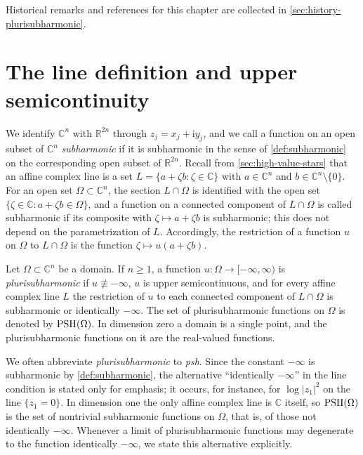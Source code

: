 Historical remarks and references for this chapter are collected in \cref{sec:history-plurisubharmonic}.

\section{The line definition and upper semicontinuity}
\label{sec:psh-definition}

We identify $\mathbb{C}^n$ with $\mathbb R^{2n}$ through $z_j=x_j+\mathrm{i}y_j$, and we call a function on an open subset of $\mathbb{C}^n$ \emph{subharmonic} if it is subharmonic in the sense of \cref{def:subharmonic} on the corresponding open subset of $\mathbb R^{2n}$. Recall from \cref{sec:high-value-stars} that an affine complex line is a set $L=\{a+\zeta b:\zeta\in\mathbb{C}\}$ with $a\in\mathbb{C}^n$ and $b\in\mathbb{C}^n\setminus\{0\}$. For an open set $\Omega\subset\mathbb{C}^n$, the section $L\cap\Omega$ is identified with the open set $\{\zeta\in\mathbb{C}:a+\zeta b\in\Omega\}$, and a function on a connected component of $L\cap\Omega$ is called subharmonic if its composite with $\zeta\mapsto a+\zeta b$ is subharmonic; this does not depend on the parametrization of $L$. Accordingly, the restriction of a function $u$ on $\Omega$ to $L\cap\Omega$ is the function $\zeta\mapsto u(a+\zeta b)$.

\begin{definition}\label{def:plurisubharmonic}
Let $\Omega\subset\mathbb{C}^n$ be a domain. If $n\ge1$, a function $u\colon\Omega\to[-\infty,\infty)$ is \emph{plurisubharmonic} if $u\not\equiv-\infty$, $u$ is upper semicontinuous, and for every affine complex line $L$ the restriction of $u$ to each connected component of $L\cap\Omega$ is subharmonic or identically $-\infty$. The set of plurisubharmonic functions on $\Omega$ is denoted by $\mathrm{PSH}(\Omega)$. In dimension zero a domain is a single point, and the plurisubharmonic functions on it are the real-valued functions.
\end{definition}
We often abbreviate \emph{plurisubharmonic} to \emph{psh}. Since the constant $-\infty$ is subharmonic by \cref{def:subharmonic}, the alternative ``identically $-\infty$'' in the line condition is stated only for emphasis; it occurs, for instance, for $\log|z_1|^2$ on the line $\{z_1=0\}$. In dimension one the only affine complex line is $\mathbb{C}$ itself, so $\mathrm{PSH}(\Omega)$ is the set of nontrivial subharmonic functions on $\Omega$, that is, of those not identically $-\infty$. Whenever a limit of plurisubharmonic functions may degenerate to the function identically $-\infty$, we state this alternative explicitly.

